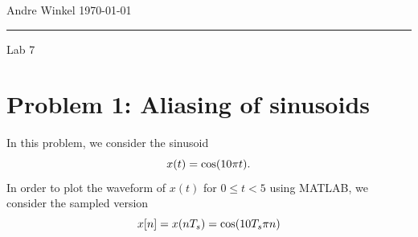 \documentclass[12pt]{article}
\begin{document}
\noindent Andre Winkel \hfill \today \\
\rule{\textwidth}{0.4pt} \vspace{0em}
\begin{center} \large{Lab 7} \end{center} \vspace*{0em}

\section*{Problem 1: Aliasing of sinusoids}
In this problem, we consider the sinusoid
\begin{equation} \notag
    x(t)=\cos(10\pi t).
\end{equation}
In order to plot the waveform of $x(t)$ for $0\le t < 5$ using MATLAB, we consider the sampled version
\begin{equation} \notag
    x[n]=x(nT_s)=\cos(10T_s\pi n)
\end{equation}
\end{document}
